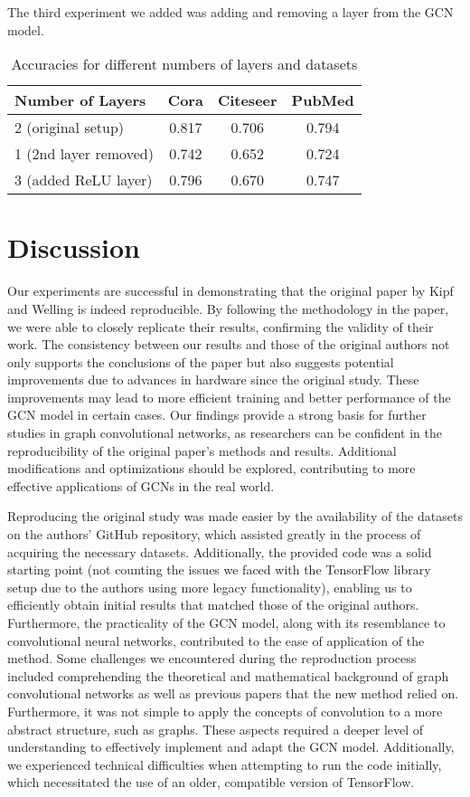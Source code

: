 \documentclass[11pt,a4paper]{article}
\begin{document}
The third experiment we added was adding and removing a layer from the GCN model.



\begin{table}[h]
  \centering
  \begin{tabular}{p{2.5cm}|c|c|c}
  \textbf{Number of Layers} & \textbf{Cora} & \textbf{Citeseer} & \textbf{PubMed} \\ \hline
  2 (original setup)      & 0.817 & 0.706 & 0.794 \\
  1 (2nd layer removed)   & 0.742 & 0.652 & 0.724 \\
  3 (added ReLU layer)    & 0.796 & 0.670 & 0.747
  \end{tabular}
  \caption{Accuracies for different numbers of layers and datasets}
  \label{table:number-of-layers}
\end{table}

\section{Discussion}

Our experiments are successful in demonstrating that the original paper by Kipf and Welling is indeed reproducible. By following the methodology in the paper, we were able to closely replicate their results, confirming the validity of their work.
The consistency between our results and those of the original authors not only supports the conclusions of the paper but also suggests potential improvements due to advances in hardware since the original study. These improvements may lead to more efficient training and better performance of the GCN model in certain cases. Our findings provide a strong basis for further studies in graph convolutional networks, as researchers can be confident in the reproducibility of the original paper's methods and results. Additional modifications and optimizations should be explored, contributing to more effective applications of GCNs in the real world.

Reproducing the original study was made easier by the availability of the datasets on the authors' GitHub repository, which assisted greatly in the process of acquiring the necessary datasets. Additionally, the provided code was a solid starting point (not counting the issues we faced with the TensorFlow library setup due to the authors using more legacy functionality), enabling us to efficiently obtain initial results that matched those of the original authors. Furthermore, the practicality of the GCN model, along with its resemblance to convolutional neural networks, contributed to the ease of application of the method.
Some challenges we encountered during the reproduction process included comprehending the theoretical and mathematical background of graph convolutional networks as well as previous papers that the new method relied on. Furthermore, it was not simple to apply the concepts of convolution to a more abstract structure, such as graphs. These aspects required a deeper level of understanding to effectively implement and adapt the GCN model. Additionally, we experienced technical difficulties when attempting to run the code initially, which necessitated the use of an older, compatible version of TensorFlow.





\end{document}
